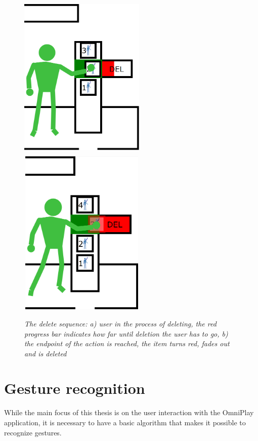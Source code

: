 \begin{figure}[H]
	\begin{center}
		\includegraphics[width=6cm, height=8cm]{figures/12_delete_progress.png}
		\includegraphics[width=6cm, height=8cm]{figures/13_delete_complete.png}
		\caption{\emph{The delete sequence: a) user in the process of deleting, the red progress bar indicates how far until deletion the user has to go, b) the endpoint of the action is reached, the item turns red, fades out and is deleted}}
		\label{delete functionality}
	\end{center}
\end{figure}


\section{Gesture recognition}

While the main focus of this thesis is on the user interaction with the OmniPlay application, it is necessary to have a basic algorithm that makes it possible to recognize gestures.\\

